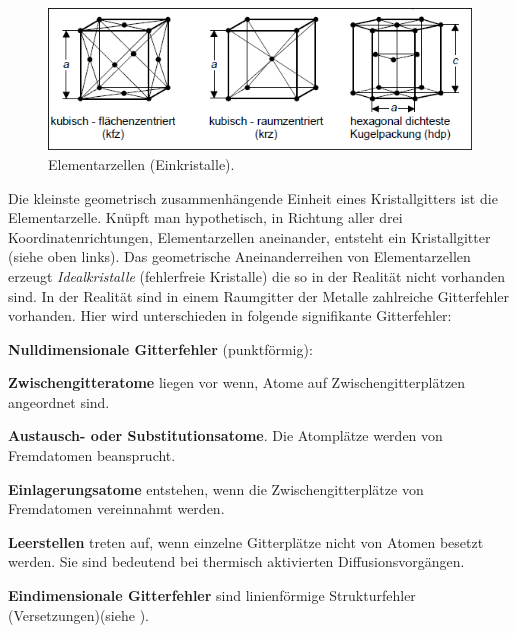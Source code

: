 \documentclass[12pt,a4paper,parskip,twoside,BCOR5mm,headsepline]{scrartcl}
\begin{document}
\begin{description*}
\begin{itemize*}
\begin{itemize*}
\end{itemize*}
\begin{figure}
\centering
\includegraphics[width=.8\textwidth]{elementarzellen}
\caption[Elementarzellen]{Elementarzellen (Einkristalle). \autocite[37]{hu}}
\label{fig:elementarzellen}
\end{figure}





Die kleinste geometrisch zusammenhängende Einheit eines Kristallgitters ist die Elementarzelle. Knüpft man hypothetisch, in Richtung aller drei Koordinatenrichtungen, Elementarzellen aneinander,  entsteht ein Kristallgitter (siehe  oben links). Das geometrische Aneinanderreihen von Elementarzellen erzeugt \emph{Idealkristalle} (fehlerfreie Kristalle) die so in der Realität nicht vorhanden sind. In der Realität sind in einem Raumgitter der Metalle zahlreiche Gitterfehler vorhanden. Hier wird unterschieden in folgende signifikante Gitterfehler:
\begin{enumerate*}
\item  \textbf{Nulldimensionale Gitterfehler} (punktförmig):
\begin{itemize*}
\item \textbf{Zwischengitteratome} liegen vor wenn,  Atome auf Zwischengitterplätzen angeordnet sind. 
\item \textbf{Austausch- oder Substitutionsatome}. Die Atomplätze werden von Fremdatomen beansprucht.
\item \textbf{Einlagerungsatome} entstehen, wenn die Zwischengitterplätze von Fremdatomen vereinnahmt werden.
\item \textbf{Leerstellen} treten auf,  wenn einzelne Gitterplätze nicht von Atomen besetzt werden. Sie sind bedeutend bei thermisch aktivierten Diffusionsvorgängen.
\end{itemize*}
\item \textbf{Eindimensionale Gitterfehler} sind linienförmige Strukturfehler (Versetzungen)(siehe ).


\end{enumerate*}
\end{itemize*}
\end{description*}
\end{document}
